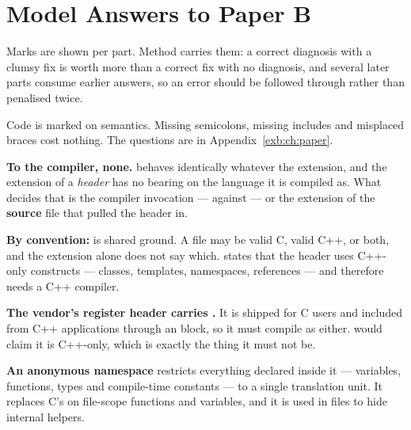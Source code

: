 
\renewcommand{\answerprefix}{ansb}

\chapter{Model Answers to Paper B}
\label{ansb:ch:answers}

Marks are shown per part. Method carries them: a correct diagnosis with a clumsy fix is worth more
than a correct fix with no diagnosis, and several later parts consume earlier answers, so an error
should be followed through rather than penalised twice.

Code is marked on semantics. Missing semicolons, missing includes and misplaced braces cost nothing.
The questions are in Appendix~\ref{exb:ch:paper}.


\textbf{To the compiler, none.}  behaves identically whatever the extension, and the
extension of a \emph{header} has no bearing on the language it is compiled as. What decides that is
the compiler invocation ---  against  --- or the extension of the
\textbf{source} file that pulled the header in. 

\textbf{By convention:}  is shared ground. A  file may be valid C, valid C++, or
both, and the extension alone does not say which.  states that the header uses C++-only
constructs --- classes, templates, namespaces, references --- and therefore needs a C++ compiler.

\textbf{The vendor's register header carries .} It is shipped for C users and included from
C++ applications through an  block, so it must compile as either.  would
claim it is C++-only, which is exactly the thing it must not be. 

\textbf{An anonymous namespace} restricts everything declared inside it --- variables, functions,
types and compile-time constants --- to a single translation unit. It replaces C's  on
file-scope functions and variables, and it is used in  files to hide internal helpers.

